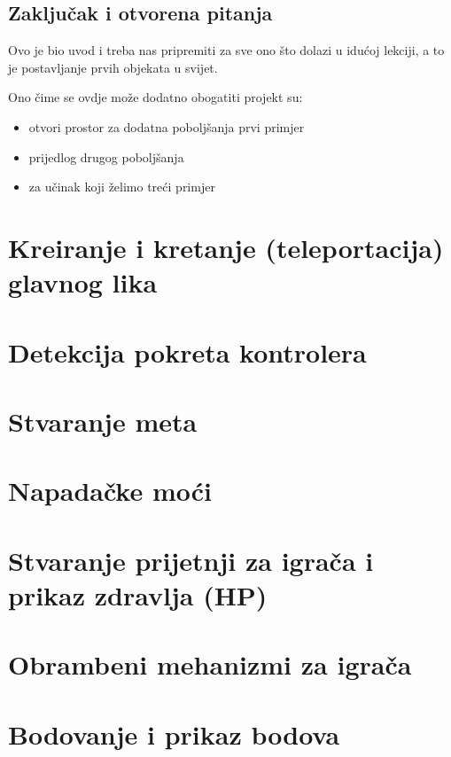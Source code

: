 \documentclass[a4paper,10pt]{article}
\begin{document}
\subsection{Zaključak i otvorena pitanja}

Ovo je bio uvod i treba nas pripremiti za sve ono što dolazi u idućoj lekciji,
a to je postavljanje prvih objekata u svijet.

Ono čime se ovdje može dodatno obogatiti projekt su:
\begin{itemize}
	\item otvori prostor za dodatna poboljšanja prvi primjer
	\item prijedlog drugog poboljšanja
	\item za učinak koji želimo treći primjer
\end{itemize}



\pagebreak
\section{Kreiranje i kretanje (teleportacija) glavnog lika}

\pagebreak
\section{Detekcija pokreta kontrolera}

\pagebreak
\section{Stvaranje meta}

\pagebreak
\section{Napadačke moći}

\pagebreak
\section{Stvaranje prijetnji za igrača i prikaz zdravlja (HP)}

\pagebreak
\section{Obrambeni mehanizmi za igrača}

\pagebreak
\section{Bodovanje i prikaz bodova}
\end{document}
